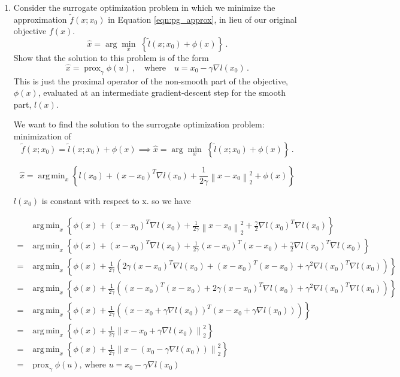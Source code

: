 \documentclass{article}
\DeclareMathOperator*{\argmin}{arg\,min}
\DeclareMathOperator*{\prox}{prox}
\newcommand{\norm}[1]{\left\lVert#1\right\rVert}
\begin{document}
\begin{enumerate}[label=(\Alph*)]
\item Consider the surrogate optimization problem in which we minimize the approximation $\tilde{f}(x; x_0)$ in Equation \ref{eqn:pg_approx}, in lieu of our original objective $f(x)$. 
$$
\hat{x} = \arg \min_x \; \left\{   \tilde{l}(x; x_0) + \phi(x)  \right\} \, .
$$
Show that the solution to this problem is of the form
\begin{equation}
\label{eqn:pg_xhat}
\hat{x} = \prox_{\gamma} \phi(u) \, , \quad \mbox{where} \quad u = x_0 - \gamma \nabla l(x_0) \, .
\end{equation}
This is just the proximal operator of the non-smooth part of the objective, $\phi(x)$, evaluated at an intermediate gradient-descent step for the smooth part, $l(x)$.

\bigskip
{\color{blue}
We want to find the solution to the surrogate optimization problem:  minimization of \\ $$\tilde{f}(x;x_0) = \tilde{l}(x;x_0) + \phi(x) \implies \hat{x} = \arg \min_x \; \left\{   \tilde{l}(x; x_0) + \phi(x)  \right\} \, .$$

$$
\hat{x} = \argmin_x \left \{ l(x_0) + (x - x_0)^{T} \nabla l(x_0) + \frac{1}{2\gamma}\norm{x - x_0}^2_2 + \phi(x) \right \}
$$

$l(x_0)$ is constant with respect to x. so we have

\begin{align}
&\argmin_x \left \{ \phi(x) + (x - x_0)^{T} \nabla l(x_0) + \frac{1}{2\gamma}\norm{x - x_0}^2_2 + \frac{\gamma}{2}\nabla l(x_0)^T\nabla l(x_0) \right \} \\
=&\argmin_x \left \{ \phi(x) + (x - x_0)^{T} \nabla l(x_0) + \frac{1}{2\gamma}(x - x_0)^{T}(x - x_0) + \frac{\gamma}{2}\nabla l(x_0)^T \nabla l(x_0)\right \} \\
=& \argmin_x \left \{ \phi(x) + \frac{1}{2\gamma} \left( 2\gamma (x - x_0)^{T} \nabla l(x_0) + (x - x_0)^{T}(x - x_0) + \gamma^2 \nabla l(x_0)^T \nabla l(x_0)\right) \right \} \\
=& \argmin_x \left \{ \phi(x) + \frac{1}{2\gamma} \left(  (x - x_0)^{T}(x - x_0) + 2\gamma (x - x_0)^{T} \nabla l(x_0) + \gamma^2 \nabla l(x_0)^T \nabla l(x_0)\right) \right \} \\
=& \argmin_x \left \{ \phi(x) + \frac{1}{2\gamma} \left(  (x - x_0 + \gamma \nabla l(x_0))^{T}(x - x_0 + \gamma \nabla l(x_0))\right) \right \} \\
=& \argmin_x \left \{ \phi(x) + \frac{1}{2\gamma}  \norm{x - x_0 + \gamma \nabla l(x_0)}_2^2  \right \} \\
=& \argmin_x \left \{ \phi(x) + \frac{1}{2\gamma}  \norm{x - (x_0 - \gamma \nabla l(x_0))}_2^2  \right \}\\
=& \prox_\gamma \phi(u)  \text{,  where } u = x_{0} - \gamma \nabla l (x_0)
\end{align}

}
\end{enumerate}
\end{document}

